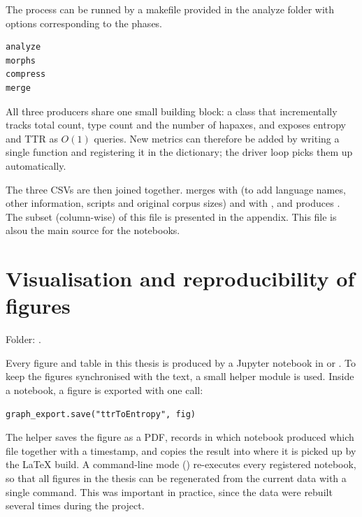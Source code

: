 The process can be runned by a makefile provided in the analyze folder with options corresponding to the phases.

\begin{lstlisting}
analyze
morphs
compress
merge
\end{lstlisting}

All three producers share one small building block: a  class that incrementally tracks total count, type count and the number of hapaxes, and exposes entropy and TTR as $O(1)$ queries. New metrics can therefore be added by writing a single function  and registering it in the  dictionary; the driver loop picks them up automatically.

The three CSVs are then joined together.  merges  with  (to add language names, other information, scripts and original corpus sizes) and with , and produces . The subset (column-wise) of this file is presented in the appendix. This file is alsou the main source for the notebooks.


\section{Visualisation and reproducibility of figures}

Folder: .

Every figure and table in this thesis is produced by a Jupyter notebook in  or . To keep the figures synchronised with the text, a small helper module  is used. Inside a notebook, a figure is exported with one call:

\begin{lstlisting}
graph_export.save("ttrToEntropy", fig)
\end{lstlisting}

The helper saves the figure as a PDF, records in  which notebook produced which file together with a timestamp, and copies the result into  where it is picked up by the LaTeX build. A command-line mode () re-executes every registered notebook, so that all figures in the thesis can be regenerated from the current data with a single command. This was important in practice, since the data were rebuilt several times during the project.

